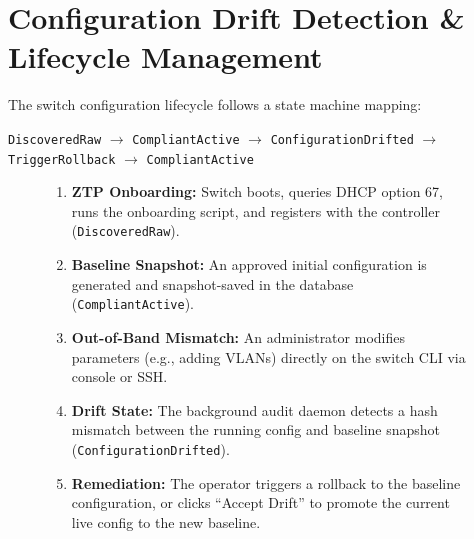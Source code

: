 \documentclass[11pt,a4paper]{article}
\begin{document}
\newpage
\section{Configuration Drift Detection \& Lifecycle Management}

The switch configuration lifecycle follows a state machine mapping:
\begin{center}
\texttt{DiscoveredRaw} $\rightarrow$ \texttt{CompliantActive} $\rightarrow$ \texttt{ConfigurationDrifted} $\rightarrow$ \texttt{TriggerRollback} $\rightarrow$ \texttt{CompliantActive}
\end{center}

\begin{figure}[ht]
\centering
\begin{tcolorbox}[colback=blue!5!white,colframe=atlasblue,title=State Transition Diagram]
\small
\begin{enumerate}
    \item \textbf{ZTP Onboarding:} Switch boots, queries DHCP option 67, runs the onboarding script, and registers with the controller (\texttt{DiscoveredRaw}).
    \item \textbf{Baseline Snapshot:} An approved initial configuration is generated and snapshot-saved in the database (\texttt{CompliantActive}).
    \item \textbf{Out-of-Band Mismatch:} An administrator modifies parameters (e.g., adding VLANs) directly on the switch CLI via console or SSH.
    \item \textbf{Drift State:} The background audit daemon detects a hash mismatch between the running config and baseline snapshot (\texttt{ConfigurationDrifted}).
    \item \textbf{Remediation:} The operator triggers a rollback to the baseline configuration, or clicks ``Accept Drift'' to promote the current live config to the new baseline.
\end{enumerate}
\end{tcolorbox}
\end{figure}
\end{document}
